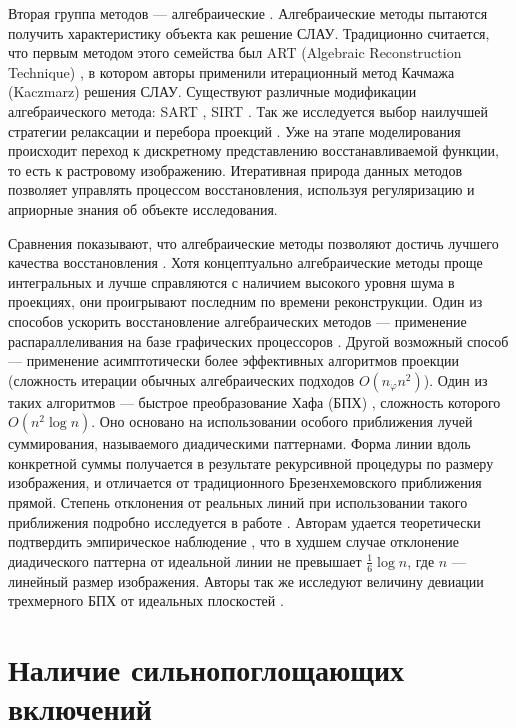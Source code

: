 Вторая группа методов --- алгебраические \cite{algebraic_methods}. 
Алгебраические методы пытаются получить характеристику объекта как решение СЛАУ.
Традиционно считается, что первым методом этого семейства был ART (Algebraic Reconstruction Technique) \cite{GORDON1970471}, в котором авторы применили итерационный метод Качмажа (Kaczmarz) \cite{Kaczmarz1937} решения СЛАУ.
Существуют различные модификации алгебраического метода: SART \cite{sart}, SIRT \cite{GILBERTSIRT}.
Так же исследуется выбор наилучшей стратегии релаксации \cite{art_regparam} и перебора проекций \cite{art_pointschoice}.
Уже на этапе моделирования происходит переход к дискретному представлению восстанавливаемой функции, то есть к растровому изображению. 
Итеративная природа данных методов позволяет управлять процессом восстановления, используя регуляризацию и априорные знания об объекте исследования.

Сравнения показывают, что алгебраические методы позволяют достичь лучшего качества восстановления \cite{sirt_less_artifacts}.
Хотя концептуально алгебраические методы проще интегральных и лучше справляются с наличием высокого уровня шума в проекциях, они проигрывают последним по времени реконструкции.
Один из способов ускорить восстановление алгебраических методов --- применение распараллеливания на базе графических процессоров \cite{buz2011cuda}.
Другой возможный способ --- применение асимптотически более эффективных алгоритмов проекции (сложность итерации обычных алгебраических подходов $O(n_\varphi n^2)$).
Один из таких алгоритмов --- быстрое преобразование Хафа (БПХ) \cite{Brady1998, hough}, сложность которого $O(n^2 \log n)$.
Оно основано на использовании особого приближения лучей суммирования, называемого диадическими паттернами.
Форма линии вдоль конкретной суммы получается в результате рекурсивной процедуры по размеру изображения, и отличается от традиционного Брезенхемовского приближения прямой.
Степень отклонения от реальных линий при использовании такого приближения подробно исследуется в работе \cite{ershov2015dyadic}.
Авторам удается теоретически подтвердить эмпирическое наблюдение \cite{Brady1998}, что в худшем случае отклонение диадического паттерна от идеальной линии не превышает $\frac 1 6 \log n$, где $n$ --- линейный размер изображения.
Авторы так же исследуют величину девиации трехмерного БПХ от идеальных плоскостей \cite{ershov3DHough}.

\section{Наличие сильнопоглощающих включений}

